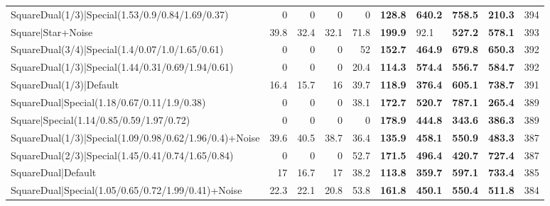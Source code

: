 \begin{tabular}{lrrrrllllr}
 SquareDual(1/3)|Special(1.53/0.9/0.84/1.69/0.37)        &          0   &          0   &          0   &             0   & \textbf{128.8} & \textbf{640.2} & \textbf{758.5} & \textbf{210.3}  &          394 \\
 Square|Star+Noise                                       &         39.8 &         32.4 &         32.1 &            71.8 & \textbf{199.9} & 92.1           & \textbf{527.2} & \textbf{578.1}  &          393 \\
 SquareDual(3/4)|Special(1.4/0.07/1.0/1.65/0.61)         &          0   &          0   &          0   &            52   & \textbf{152.7} & \textbf{464.9} & \textbf{679.8} & \textbf{650.3}  &          392 \\
 SquareDual(1/3)|Special(1.44/0.31/0.69/1.94/0.61)       &          0   &          0   &          0   &            20.4 & \textbf{114.3} & \textbf{574.4} & \textbf{556.7} & \textbf{584.7}  &          392 \\
 SquareDual(1/3)|Default                                 &         16.4 &         15.7 &         16   &            39.7 & \textbf{118.9} & \textbf{376.4} & \textbf{605.1} & \textbf{738.7}  &          391 \\
 SquareDual|Special(1.18/0.67/0.11/1.9/0.38)             &          0   &          0   &          0   &            38.1 & \textbf{172.7} & \textbf{520.7} & \textbf{787.1} & \textbf{265.4}  &          389 \\
 Square|Special(1.14/0.85/0.59/1.97/0.72)                &          0   &          0   &          0   &             0   & \textbf{178.9} & \textbf{444.8} & \textbf{343.6} & \textbf{386.3}  &          389 \\
 SquareDual(1/3)|Special(1.09/0.98/0.62/1.96/0.4)+Noise  &         39.6 &         40.5 &         38.7 &            36.4 & \textbf{135.9} & \textbf{458.1} & \textbf{550.9} & \textbf{483.3}  &          387 \\
 SquareDual(2/3)|Special(1.45/0.41/0.74/1.65/0.84)       &          0   &          0   &          0   &            52.7 & \textbf{171.5} & \textbf{496.4} & \textbf{420.7} & \textbf{727.4}  &          387 \\
 SquareDual|Default                                      &         17   &         16.7 &         17   &            38.2 & \textbf{113.8} & \textbf{359.7} & \textbf{597.1} & \textbf{733.4}  &          385 \\
 SquareDual|Special(1.05/0.65/0.72/1.99/0.41)+Noise      &         22.3 &         22.1 &         20.8 &            53.8 & \textbf{161.8} & \textbf{450.1} & \textbf{550.4} & \textbf{511.8}  &          384 \\

\end{tabular}
